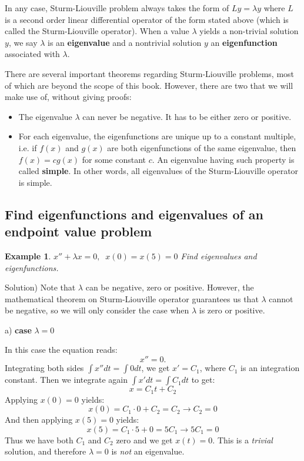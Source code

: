 \documentclass[12pt]{report}
\newtheorem{ex}{Example}[section]
\begin{document}
In any case, Sturm-Liouville problem always takes the form of $L y = \lambda y$ where $L$ is a second order linear differential operator of the form stated above (which is called the Sturm-Liouville operator). When a value $\lambda$ yields a non-trivial solution $y$, we say $\lambda$ is an \textbf{eigenvalue } and a nontrivial solution $y$ an \textbf{eigenfunction } associated with $\lambda$.

There are several important theorems regarding Sturm-Liouville problems, most of which are beyond the scope of this book. However, there are two that we will make use of, without giving proofs:

\begin{itemize}
	\item The eigenvalue $\lambda$ can never be negative. It has to be either zero or positive.
	\item For each eigenvalue, the eigenfunctions are unique up to a constant multiple, i.e. if $f(x)$ and $g(x)$ are both eigenfunctions of the same eigenvalue, then $f(x)=c g(x)$ for some constant $c$. An eigenvalue having such property is called \textbf{simple}. In other words, all eigenvalues of the Sturm-Liouville operator is simple.
\end{itemize} 


\subsection*{Find eigenfunctions and eigenvalues of an endpoint value problem }
\begin{ex} $x'' + \lambda x = 0, \; \; x(0)=x(5)=0$
Find eigenvalues and eigenfunctions.
\end{ex}

Solution) Note that $\lambda$ can be negative, zero or positive. However, the mathematical theorem on Sturm-Liouville operator guarantees us that $\lambda$ cannot be negative, so we will only consider the case when $\lambda$ is zero or positive.

a) \textbf{case } $\lambda=0$

In this case the equation reads:
$$x''=0.$$
Integrating both sides $\int x'' dt = \int 0 dt $, we get $x' = C_1$, where $C_1$ is an integration constant. Then we integrate again  $\int x' dt = \int C_1 dt$ to get:
$$x = C_1 t +C_2 $$
Applying $x(0)=0$ yields:
$$x(0)= C_1\cdot 0 + C_2 = C_2 \rightarrow C_2=0$$
And then applying $x(5)=0$ yields:
$$x(5) = C_1\cdot 5 + 0 = 5C_1 \rightarrow 5C_1=0$$
Thus we have both $C_1$ and $C_2$ zero and we get $x(t)=0$. This is a \textit{trivial} solution, and therefore $\lambda =0$ is \textit{not} an eigenvalue. 
\end{document}
